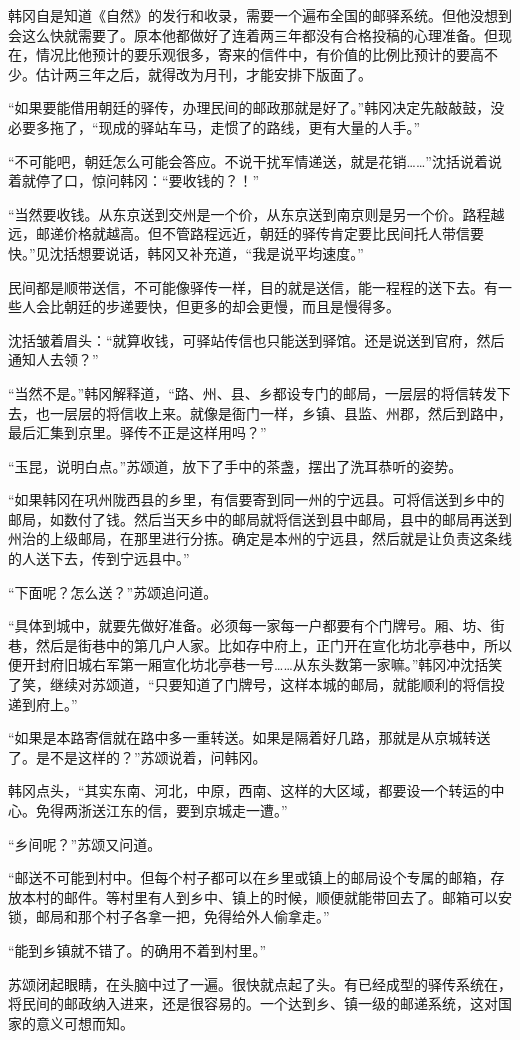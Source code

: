 韩冈自是知道《自然》的发行和收录，需要一个遍布全国的邮驿系统。但他没想到会这么快就需要了。原本他都做好了连着两三年都没有合格投稿的心理准备。但现在，情况比他预计的要乐观很多，寄来的信件中，有价值的比例比预计的要高不少。估计两三年之后，就得改为月刊，才能安排下版面了。

“如果要能借用朝廷的驿传，办理民间的邮政那就是好了。”韩冈决定先敲敲鼓，没必要多拖了，“现成的驿站车马，走惯了的路线，更有大量的人手。”

“不可能吧，朝廷怎么可能会答应。不说干扰军情递送，就是花销……”沈括说着说着就停了口，惊问韩冈：“要收钱的？！”

“当然要收钱。从东京送到交州是一个价，从东京送到南京则是另一个价。路程越远，邮递价格就越高。但不管路程远近，朝廷的驿传肯定要比民间托人带信要快。”见沈括想要说话，韩冈又补充道，“我是说平均速度。”

民间都是顺带送信，不可能像驿传一样，目的就是送信，能一程程的送下去。有一些人会比朝廷的步递要快，但更多的却会更慢，而且是慢得多。

沈括皱着眉头：“就算收钱，可驿站传信也只能送到驿馆。还是说送到官府，然后通知人去领？”

“当然不是。”韩冈解释道，“路、州、县、乡都设专门的邮局，一层层的将信转发下去，也一层层的将信收上来。就像是衙门一样，乡镇、县监、州郡，然后到路中，最后汇集到京里。驿传不正是这样用吗？”

“玉昆，说明白点。”苏颂道，放下了手中的茶盏，摆出了洗耳恭听的姿势。

“如果韩冈在巩州陇西县的乡里，有信要寄到同一州的宁远县。可将信送到乡中的邮局，如数付了钱。然后当天乡中的邮局就将信送到县中邮局，县中的邮局再送到州治的上级邮局，在那里进行分拣。确定是本州的宁远县，然后就是让负责这条线的人送下去，传到宁远县中。”

“下面呢？怎么送？”苏颂追问道。

“具体到城中，就要先做好准备。必须每一家每一户都要有个门牌号。厢、坊、街巷，然后是街巷中的第几户人家。比如存中府上，正门开在宣化坊北亭巷中，所以便开封府旧城右军第一厢宣化坊北亭巷一号……从东头数第一家嘛。”韩冈冲沈括笑了笑，继续对苏颂道，“只要知道了门牌号，这样本城的邮局，就能顺利的将信投递到府上。”

“如果是本路寄信就在路中多一重转送。如果是隔着好几路，那就是从京城转送了。是不是这样的？”苏颂说着，问韩冈。

韩冈点头，“其实东南、河北，中原，西南、这样的大区域，都要设一个转运的中心。免得两浙送江东的信，要到京城走一遭。”

“乡间呢？”苏颂又问道。

“邮送不可能到村中。但每个村子都可以在乡里或镇上的邮局设个专属的邮箱，存放本村的邮件。等村里有人到乡中、镇上的时候，顺便就能带回去了。邮箱可以安锁，邮局和那个村子各拿一把，免得给外人偷拿走。”

“能到乡镇就不错了。的确用不着到村里。”

苏颂闭起眼睛，在头脑中过了一遍。很快就点起了头。有已经成型的驿传系统在，将民间的邮政纳入进来，还是很容易的。一个达到乡、镇一级的邮递系统，这对国家的意义可想而知。

